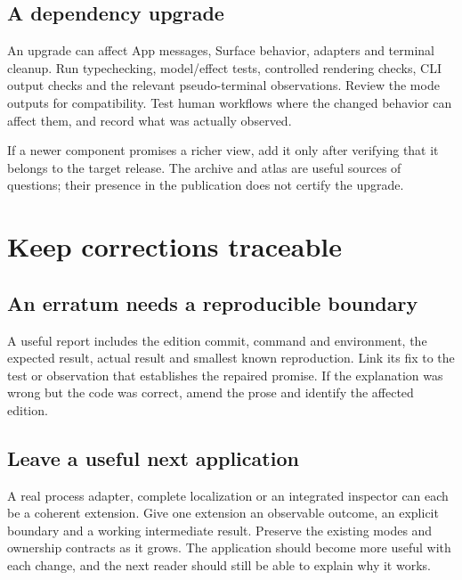 \subsection{A dependency upgrade}

An upgrade can affect App messages, Surface behavior, adapters and terminal cleanup. Run typechecking, model/effect tests, controlled rendering checks, CLI output checks and the relevant pseudo-terminal observations. Review the mode outputs for compatibility. Test human workflows where the changed behavior can affect them, and record what was actually observed.

If a newer component promises a richer view, add it only after verifying that it belongs to the target release. The archive and atlas are useful sources of questions; their presence in the publication does not certify the upgrade.

\section{Keep corrections traceable}
\subsection{An erratum needs a reproducible boundary}

A useful report includes the edition commit, command and environment, the expected result, actual result and smallest known reproduction. Link its fix to the test or observation that establishes the repaired promise. If the explanation was wrong but the code was correct, amend the prose and identify the affected edition.

\subsection{Leave a useful next application}

A real process adapter, complete localization or an integrated inspector can each be a coherent extension. Give one extension an observable outcome, an explicit boundary and a working intermediate result. Preserve the existing modes and ownership contracts as it grows. The application should become more useful with each change, and the next reader should still be able to explain why it works.

